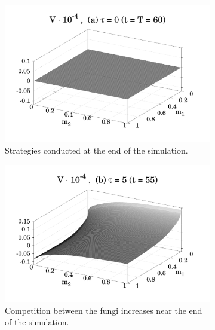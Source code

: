 \documentclass[11pt]{amsart}
\begin{document}
\begin{figure}
    \begin{subfigure}{.48 \textwidth}
        \includegraphics[width = \textwidth]{figures/Figure_4a.pdf}
        \caption{Strategies conducted at the end of the simulation.}
        \label{fig_4_a}
    \end{subfigure}
    \hfill
    \begin{subfigure}{.48 \textwidth}
        \includegraphics[width = \textwidth]{figures/Figure_4b_1.pdf}
        \caption{Competition between the fungi increases near the end of the simulation.}
        \label{fig_4_b}
    \end{subfigure}
    \hfill
    \begin{subfigure}{.48 \textwidth}

\end{subfigure}
\end{figure}
\end{document}
